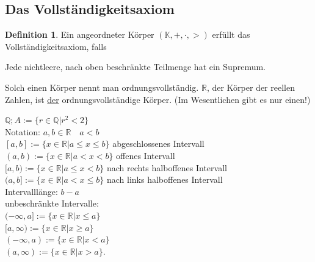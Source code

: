 \documentclass[12pt,a4paper,titlepage]{article} %
\theoremstyle{definition}
\newtheorem{defi}{Definition}[subsection]
\theoremstyle{remark}
\begin{document}
\subsection{Das Vollständigkeitsaxiom}
\begin{defi}
	Ein angeordneter Körper $(\mathbb{K},+,\cdot,>)$ erfüllt das Vollständigkeitsaxiom, falls\\
	\begin{center}
		Jede nichtleere, nach oben beschränkte Teilmenge hat ein Supremum.
	\end{center}
	Solch einen Körper nennt man ordnungsvollständig. $\mathbb{R}$, der Körper der reellen Zahlen, ist \underline{der} ordnungsvollständige Körper. (Im Wesentlichen gibt es nur einen!)
\end{defi}
$\mathbb{Q}; A:= \{r\in\mathbb{Q}|r^2 < 2\}$\\
Notation: $a,b\in\mathbb{R} \quad a<b$\\
$[a,b] := \{x\in\mathbb{R}|a\leq x\leq b\}$ abgeschlossenes Intervall\\
$(a,b) := \{x\in\mathbb{R} | a<x<b\}$ offenes Intervall\\
$[a,b) := \{x\in\mathbb{R}|a\leq x<b\}$ nach rechts halboffenes Intervall\\
$(a,b] := \{x\in\mathbb{R}|a<x\leq b\}$ nach links halboffenes Intervall\\
Intervalllänge: $b-a$\\
unbeschränkte Intervalle:\\
$(-\infty, a] := \{x\in\mathbb{R}|x\leq a\}$\\
$[a,\infty) := \{x\in\mathbb{R}|x\geq a\}$\\
$(-\infty, a) := \{x\in\mathbb{R}|x<a\}$\\
$(a, \infty) := \{x\in\mathbb{R}|x>a\}$.
\end{document}
